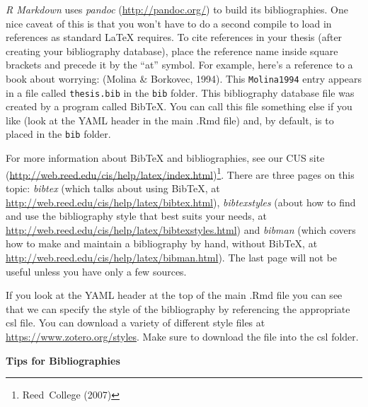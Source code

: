 \documentclass[12pt,twoside]{reedthesis}
\begin{document}
  \emph{R Markdown} uses \emph{pandoc} (\url{http://pandoc.org/}) to build
  its bibliographies. One nice caveat of this is that you won't have to do
  a second compile to load in references as standard LaTeX requires. To
  cite references in your thesis (after creating your bibliography
  database), place the reference name inside square brackets and precede
  it by the ``at'' symbol. For example, here's a reference to a book about
  worrying: (Molina \& Borkovec, 1994). This \texttt{Molina1994} entry
  appears in a file called \texttt{thesis.bib} in the \texttt{bib} folder.
  This bibliography database file was created by a program called BibTeX.
  You can call this file something else if you like (look at the YAML
  header in the main .Rmd file) and, by default, is to placed in the
  \texttt{bib} folder.
  
  For more information about BibTeX and bibliographies, see our CUS site
  (\url{http://web.reed.edu/cis/help/latex/index.html})\footnote{Reed~College
    (2007)}. There are three pages on this topic: \emph{bibtex} (which
  talks about using BibTeX, at
  \url{http://web.reed.edu/cis/help/latex/bibtex.html}),
  \emph{bibtexstyles} (about how to find and use the bibliography style
  that best suits your needs, at
  \url{http://web.reed.edu/cis/help/latex/bibtexstyles.html}) and
  \emph{bibman} (which covers how to make and maintain a bibliography by
  hand, without BibTeX, at
  \url{http://web.reed.edu/cis/help/latex/bibman.html}). The last page
  will not be useful unless you have only a few sources.
  
  If you look at the YAML header at the top of the main .Rmd file you can
  see that we can specify the style of the bibliography by referencing the
  appropriate csl file. You can download a variety of different style
  files at \url{https://www.zotero.org/styles}. Make sure to download the
  file into the csl folder.
  
  \textbf{Tips for Bibliographies}
  
\end{document}
